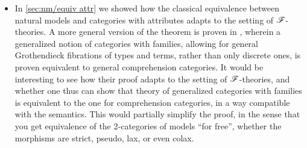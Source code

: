 \documentclass[../thesis.tex]{subfiles}
\begin{document}
\begin{itemize}
  \item In \cref{sec:nm/equiv attr} we showed how the classical equivalence between natural models and categories with attributes
    adapts to the setting of ${\mathscr{F}}$-theories. A more general version of the theorem is proven in \cite{coraglia2024b}, wherein
    a generalized notion of categories with families, allowing for general Grothendieck fibrations of types and terms, rather
    than only discrete ones, is proven equivalent to general comprehension categories. It would be interesting to see how their
    proof adapts to the setting of ${\mathscr{F}}$-theories, and whether one thus can show that theory of generalized categories with
    families is equivalent to the one for comprehension categories, in a way compatible with the semantics. This would partially
    simplify the proof, in the sense that you get equivalence of the 2-categories of models ``for free'', whether the morphisms
    are strict, pseudo, lax, or even colax.
\end{itemize}

\ifSubfilesClassLoaded{\printbibliography}{}
\end{document}
